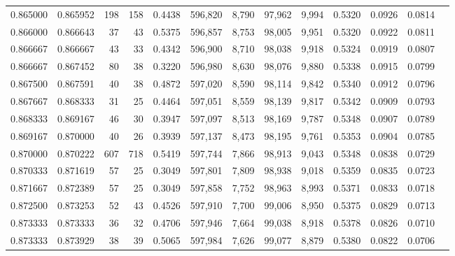 \begin{tabular}{rrrrrrrrrrrrr}
0.865000 & 0.865952 &   198 & 158 &                                     0.4438 & 596,820 &   8,790 &  97,962 &   9,994 & 0.5320 & 0.0926 & 0.0814 \\
0.866000 & 0.866643 &    37 &  43 &                                     0.5375 & 596,857 &   8,753 &  98,005 &   9,951 & 0.5320 & 0.0922 & 0.0811 \\
0.866667 & 0.866667 &    43 &  33 &                                     0.4342 & 596,900 &   8,710 &  98,038 &   9,918 & 0.5324 & 0.0919 & 0.0807 \\
0.866667 & 0.867452 &    80 &  38 &                                     0.3220 & 596,980 &   8,630 &  98,076 &   9,880 & 0.5338 & 0.0915 & 0.0799 \\
0.867500 & 0.867591 &    40 &  38 &                                     0.4872 & 597,020 &   8,590 &  98,114 &   9,842 & 0.5340 & 0.0912 & 0.0796 \\
0.867667 & 0.868333 &    31 &  25 &                                     0.4464 & 597,051 &   8,559 &  98,139 &   9,817 & 0.5342 & 0.0909 & 0.0793 \\
0.868333 & 0.869167 &    46 &  30 &                                     0.3947 & 597,097 &   8,513 &  98,169 &   9,787 & 0.5348 & 0.0907 & 0.0789 \\
0.869167 & 0.870000 &    40 &  26 &                                     0.3939 & 597,137 &   8,473 &  98,195 &   9,761 & 0.5353 & 0.0904 & 0.0785 \\
0.870000 & 0.870222 &   607 & 718 &                                     0.5419 & 597,744 &   7,866 &  98,913 &   9,043 & 0.5348 & 0.0838 & 0.0729 \\
0.870333 & 0.871619 &    57 &  25 &                                     0.3049 & 597,801 &   7,809 &  98,938 &   9,018 & 0.5359 & 0.0835 & 0.0723 \\
0.871667 & 0.872389 &    57 &  25 &                                     0.3049 & 597,858 &   7,752 &  98,963 &   8,993 & 0.5371 & 0.0833 & 0.0718 \\
0.872500 & 0.873253 &    52 &  43 &                                     0.4526 & 597,910 &   7,700 &  99,006 &   8,950 & 0.5375 & 0.0829 & 0.0713 \\
0.873333 & 0.873333 &    36 &  32 &                                     0.4706 & 597,946 &   7,664 &  99,038 &   8,918 & 0.5378 & 0.0826 & 0.0710 \\
0.873333 & 0.873929 &    38 &  39 &                                     0.5065 & 597,984 &   7,626 &  99,077 &   8,879 & 0.5380 & 0.0822 & 0.0706 \\

\end{tabular}
